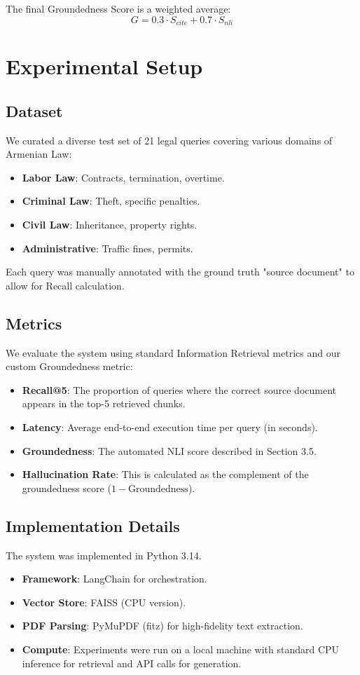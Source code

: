 \documentclass[11pt]{article}
\begin{document}
The final Groundedness Score is a weighted average:
\begin{equation}
    G = 0.3 \cdot S_{cite} + 0.7 \cdot S_{nli}
\end{equation}

\section{Experimental Setup}

\subsection{Dataset}
We curated a diverse test set of 21 legal queries covering various domains of Armenian Law:
\begin{itemize}
    \item \textbf{Labor Law}: Contracts, termination, overtime.
    \item \textbf{Criminal Law}: Theft, specific penalties.
    \item \textbf{Civil Law}: Inheritance, property rights.
    \item \textbf{Administrative}: Traffic fines, permits.
\end{itemize}
Each query was manually annotated with the ground truth "source document" to allow for Recall calculation.

\subsection{Metrics}
We evaluate the system using standard Information Retrieval metrics and our custom Groundedness metric:
\begin{itemize}
    \item \textbf{Recall@5}: The proportion of queries where the correct source document appears in the top-5 retrieved chunks.
    \item \textbf{Latency}: Average end-to-end execution time per query (in seconds).
    \item \textbf{Groundedness}: The automated NLI score described in Section 3.5.
    \item \textbf{Hallucination Rate}: This is calculated as the complement of the groundedness score ($1 - \text{Groundedness}$).
\end{itemize}

\subsection{Implementation Details}
The system was implemented in Python 3.14.
\begin{itemize}
    \item \textbf{Framework}: LangChain for orchestration.
    \item \textbf{Vector Store}: FAISS (CPU version).
    \item \textbf{PDF Parsing}: PyMuPDF (fitz) for high-fidelity text extraction.
    \item \textbf{Compute}: Experiments were run on a local machine with standard CPU inference for retrieval and API calls for generation.
\end{itemize}
\end{document}

